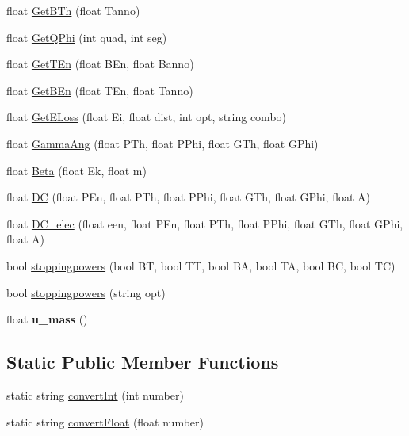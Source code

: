 \begin{DoxyCompactItemize}
\item 
float \hyperlink{classdoppler_ac834d80156ae80009b508ae41fedde3d}{Get\-B\-Th} (float Tanno)
\item 
float \hyperlink{classdoppler_a7c3afd05ed9ddb8c5bedc0de905acd0b}{Get\-Q\-Phi} (int quad, int seg)
\item 
float \hyperlink{classdoppler_a31a09afe8920dc1302162ec8e0be9302}{Get\-T\-En} (float B\-En, float Banno)
\item 
float \hyperlink{classdoppler_a182d987ddc6db4a8b8e7f7821bda3846}{Get\-B\-En} (float T\-En, float Tanno)
\item 
float \hyperlink{classdoppler_a64570ec784dabd6e17cf836489450527}{Get\-E\-Loss} (float Ei, float dist, int opt, string combo)
\item 
float \hyperlink{classdoppler_a6dca381f91f2267abefadd62cf66f69f}{Gamma\-Ang} (float P\-Th, float P\-Phi, float G\-Th, float G\-Phi)
\item 
float \hyperlink{classdoppler_a28eb084d224fdb58fda1d6f6c61dd232}{Beta} (float Ek, float m)
\item 
float \hyperlink{classdoppler_a7f08d93d2bfa269f8c22ac71b604b09a}{D\-C} (float P\-En, float P\-Th, float P\-Phi, float G\-Th, float G\-Phi, float A)
\item 
float \hyperlink{classdoppler_ad8387753c2288d464b64579a23d3bc4e}{D\-C\-\_\-elec} (float een, float P\-En, float P\-Th, float P\-Phi, float G\-Th, float G\-Phi, float A)
\item 
bool \hyperlink{classdoppler_ad91321c9c9220fff724e5e0982e1a8b8}{stoppingpowers} (bool B\-T, bool T\-T, bool B\-A, bool T\-A, bool B\-C, bool T\-C)
\item 
bool \hyperlink{classdoppler_a4be762591578e28f8e9d646475ca943a}{stoppingpowers} (string opt)
\item 
\hypertarget{classdoppler_a68d168fdd3cb3edeb4a015aeaf0d3391}{float {\bfseries u\-\_\-mass} ()}\label{classdoppler_a68d168fdd3cb3edeb4a015aeaf0d3391}

\end{DoxyCompactItemize}
\subsection*{Static Public Member Functions}
\begin{DoxyCompactItemize}
\item 
static string \hyperlink{classdoppler_a100e363bf80b5371baebb89bbf60b824}{convert\-Int} (int number)
\item 
static string \hyperlink{classdoppler_a0fa8eec8989c81e59ecfb8e09140020c}{convert\-Float} (float number)
\end{DoxyCompactItemize}
